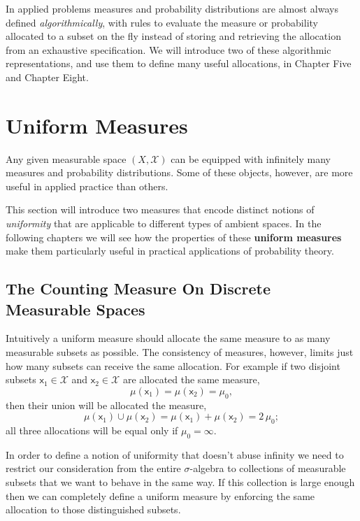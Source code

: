 \documentclass[
  letterpaper,
  DIV=11,
  numbers=noendperiod]{scrartcl}
\begin{document}
In applied problems measures and probability distributions are almost
always defined \emph{algorithmically}, with rules to evaluate the
measure or probability allocated to a subset on the fly instead of
storing and retrieving the allocation from an exhaustive specification.
We will introduce two of these algorithmic representations, and use them
to define many useful allocations, in Chapter Five and Chapter Eight.

\hypertarget{uniform-measures}{%
\section{Uniform Measures}\label{uniform-measures}}

Any given measurable space \((X, \mathcal{X})\) can be equipped with
infinitely many measures and probability distributions. Some of these
objects, however, are more useful in applied practice than others.

This section will introduce two measures that encode distinct notions of
\emph{uniformity} that are applicable to different types of ambient
spaces. In the following chapters we will see how the properties of
these \textbf{uniform measures} make them particularly useful in
practical applications of probability theory.

\hypertarget{the-counting-measure-on-discrete-measurable-spaces}{%
\subsection{The Counting Measure On Discrete Measurable
Spaces}\label{the-counting-measure-on-discrete-measurable-spaces}}

Intuitively a uniform measure should allocate the same measure to as
many measurable subsets as possible. The consistency of measures,
however, limits just how many subsets can receive the same allocation.
For example if two disjoint subsets \(\mathsf{x}_{1} \in \mathcal{X}\)
and \(\mathsf{x}_{2} \in \mathcal{X}\) are allocated the same measure,
\[
\mu(\mathsf{x}_{1}) = \mu(\mathsf{x}_{2}) = \mu_{0},
\] then their union will be allocated the measure, \[
\mu(\mathsf{x}_{1}) \cup \mu(\mathsf{x}_{2})
=
\mu(\mathsf{x}_{1}) + \mu(\mathsf{x}_{2})
=
2 \, \mu_{0};
\] all three allocations will be equal only if \(\mu_{0} = \infty\).

In order to define a notion of uniformity that doesn't abuse infinity we
need to restrict our consideration from the entire \(\sigma\)-algebra to
collections of measurable subsets that we want to behave in the same
way. If this collection is large enough then we can completely define a
uniform measure by enforcing the same allocation to those distinguished
subsets.
\end{document}
